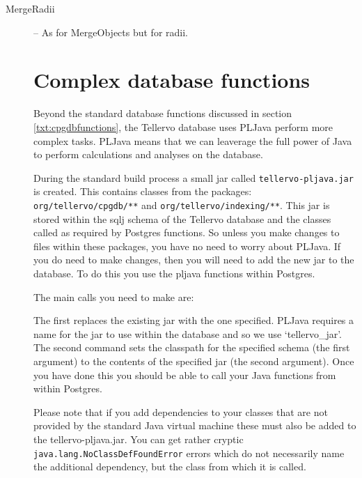 \begin{description}
 \item[MergeRadii] -- As for MergeObjects but for radii.



\section{Complex database functions}
Beyond the standard database functions discussed in section \ref{txt:cpgdbfunctions}, the Tellervo database uses PLJava perform more complex tasks.  PLJava means that we can leaverage the full power of Java to perform calculations and analyses on the database.  

During the standard build process a small jar called \verb|tellervo-pljava.jar| is created.  This contains classes from the packages: \verb|org/tellervo/cpgdb/**| and \verb |org/tellervo/indexing/**|.  This jar is stored within the sqlj schema of the Tellervo database and the classes called as required by Postgres functions.  So unless you make changes to files within these packages, you have no need to worry about PLJava.  If you do need to make changes, then you will need to add the new jar to the database.  To do this you use the pljava functions within Postgres.  

The main calls you need to make are: 
 
The first replaces the existing jar with the one specified.  PLJava requires a name for the jar to use within the database and so we use `tellervo\_jar'.  The second command sets the classpath for the specified schema (the first argument) to the contents of the specified jar (the second argument).  Once you have done this you should be able to call your Java functions from within Postgres.

Please note that if you add dependencies to your classes that are not provided by the standard Java virtual machine these must also be added to the tellervo-pljava.jar.  You can get rather cryptic \verb|java.lang.NoClassDefFoundError| errors which do not necessarily name the additional dependency, but the class from which it is called.



\end{description}